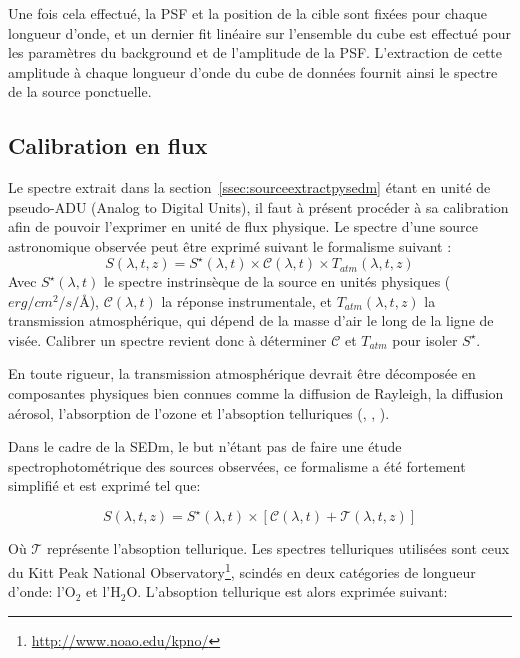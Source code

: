 \documentclass[../main/main.tex]{subfiles}
\begin{document}
Une fois cela effectué, la PSF et la position de la cible sont fixées pour
chaque longueur d'onde, et un dernier fit linéaire sur l'ensemble du
cube est effectué pour les
paramètres du background et de l'amplitude de la PSF. L'extraction de
cette amplitude à chaque longueur d'onde du cube de données fournit
ainsi le spectre de la source ponctuelle.


\subsection{Calibration en flux}

Le spectre extrait dans la section~\ref{ssec:sourceextractpysedm} étant en
unité de pseudo-ADU (Analog to Digital Units), il faut à présent procéder à sa
calibration afin de pouvoir l'exprimer en unité de flux physique.
Le spectre d'une source astronomique observée peut être exprimé suivant
le formalisme suivant \citep{Buton2013}:
\begin{equation}
  \label{eq:calibbutoon}
  S(\lambda,t,z)=S^{\star}(\lambda,t)\times\mathcal{C}(\lambda,t)\times T_{atm}(\lambda,t,z)
\end{equation}
Avec $S^{\star}(\lambda,t)$ le spectre instrinsèque de la source en
unités physiques ($erg/cm^2/s/$\AA), $\mathcal{C}(\lambda,t)$ la réponse
instrumentale, et $T_{atm}(\lambda,t,z)$ la transmission atmosphérique, qui
dépend de la masse d'air le long de la ligne de visée. Calibrer un
spectre revient donc à déterminer $\mathcal{C}$ et $T_{atm}$ pour isoler $S^{\star}$.

En toute rigueur, la transmission atmosphérique devrait être décomposée
en composantes physiques bien connues comme la diffusion de Rayleigh, la
diffusion aérosol,
l'absorption de l'ozone et l'absoption telluriques
(\citet{Hayes1975atm}, \citet{Wade1988atm}, \citet{Stubbs2007atm} ).

Dans le cadre de la SEDm, le but n'étant pas de faire une étude
spectrophotométrique des sources observées, ce formalisme a été
fortement simplifié et est exprimé tel que:

\begin{equation}
  \label{eq:calibbutoon}
  S(\lambda,t,z)=S^{\star}(\lambda,t)\times\left[\mathcal{C}(\lambda,t)+\mathcal{ T}(\lambda,t,z)\right]
\end{equation}

Où $\mathcal{ T}$ représente l'absoption tellurique. Les spectres
telluriques utilisées sont ceux du Kitt Peak National
Observatory\footnote{\url{http://www.noao.edu/kpno/}}, scindés en deux
catégories de longueur d'onde: l'$\text{O}_{2}$ et
l'$\text{H}_{2}\text{O}$.
L'absoption tellurique est alors exprimée suivant:
\end{document}
